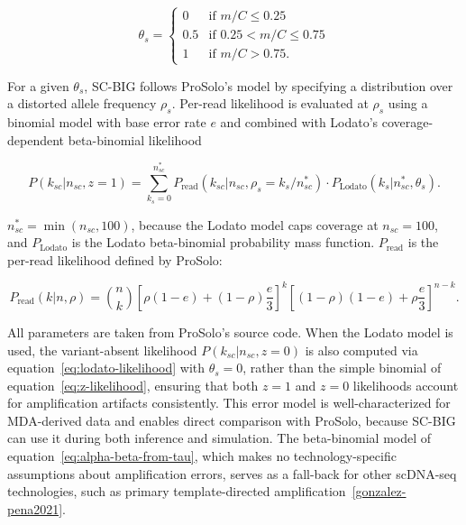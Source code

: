 \documentclass[10pt]{article}
\begin{document}
\begin{equation}
    \theta_s = \begin{cases}
        0   & \text{if } m/C \leq 0.25 \\
        0.5 & \text{if } 0.25 < m/C \leq 0.75 \\
        1   & \text{if } m/C > 0.75.
    \end{cases}
\label{eq:lodato-af-mapping}
\end{equation}

For a given $\theta_s$, SC-BIG follows ProSolo's model by specifying a distribution over a distorted allele frequency $\rho_s$.
Per-read likelihood is evaluated at $\rho_s$ using a binomial model with base error rate $e$ and combined with Lodato's coverage-dependent beta-binomial likelihood

\begin{equation}
    P(k_{sc} | n_{sc}, z=1) = \sum_{k_s=0}^{n_{sc}^*}
        P_{\text{read}}(k_{sc} | n_{sc}, \rho_s = k_s / n_{sc}^*)
        \cdot P_{\text{Lodato}}(k_s | n_{sc}^*, \theta_s)
    .
\label{eq:lodato-likelihood}
\end{equation}

$n_{sc}^* = \min(n_{sc}, 100)$, because the Lodato model caps coverage at $n_{sc} = 100$, and $P_{\text{Lodato}}$ is the Lodato beta-binomial probability mass function.
$P_{\text{read}}$ is the per-read likelihood defined by ProSolo:

\begin{equation}
    P_{\text{read}}(k | n, \rho) = \binom{n}{k} \left[\rho(1-e) + (1-\rho)\frac{e}{3}\right]^k \left[(1-\rho)(1-e) + \rho\frac{e}{3}\right]^{n-k}
    .
\end{equation}

All parameters are taken from ProSolo's source code.
When the Lodato model is used, the variant-absent likelihood $P(k_{sc} | n_{sc}, z=0)$ is also computed via equation~\eqref{eq:lodato-likelihood} with $\theta_s = 0$, rather than the simple binomial of equation~\eqref{eq:z-likelihood}, ensuring that both $z=1$ and $z=0$ likelihoods account for amplification artifacts consistently.
This error model is well-characterized for MDA-derived data and enables direct comparison with ProSolo, because SC-BIG can use it during both inference and simulation.
The beta-binomial model of equation~\eqref{eq:alpha-beta-from-tau}, which makes no technology-specific assumptions about amplification errors, serves as a fall-back for other scDNA-seq technologies, such as primary template-directed amplification~\ref{gonzalez-pena2021}.
\end{document}
